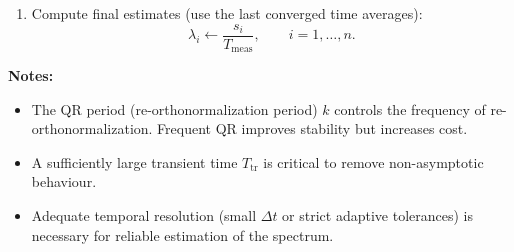 \documentclass[11pt,a4paper]{report}
\newcommand{\thesisbibfile}{refs}
\begin{document}
\begin{center}
\begin{tcolorbox}[appendixalgobox,width=0.95\linewidth]
\begin{enumerate}
\begin{enumerate}
\begin{enumerate}
\begin{enumerate}
            \item Compute QR: $\mathbf{Q} = \mathbf{Q}\mathbf{R}$.
            \item Accumulate diagonal growth:
              \begin{equation*}
              s_i \leftarrow s_i + \log |R_{ii}|,\qquad i=1,\dots,n.
              \end{equation*}
          \end{enumerate}
        \item Update $t \leftarrow t + \Delta t$.
      \end{enumerate}
    \end{enumerate}
  \item Compute final estimates (use the last converged time averages):
    \begin{equation*}
    \lambda_i \leftarrow \frac{s_i}{T_{\mathrm{meas}}},\qquad i=1,\dots,n.
    \end{equation*}
\end{enumerate}

\vspace{0.25em}
\textbf{Notes:}
\begin{itemize}
  \item The QR period (re-orthonormalization period) $k$ controls the frequency of re-orthonormalization. Frequent QR improves stability
        but increases cost.
  \item A sufficiently large transient time $T_{\mathrm{tr}}$ is critical to remove non-asymptotic behaviour.
  \item Adequate temporal resolution (small $\Delta t$ or strict adaptive tolerances) is necessary for
        reliable estimation of the spectrum.
\end{itemize}
\end{tcolorbox}
\end{center}





\end{document}
